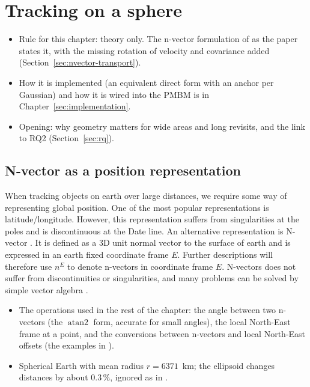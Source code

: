 \section{Tracking on a sphere}
\label{sec:nvector}
\begin{itemize}
    \item Rule for this chapter: theory only. The n-vector formulation of \cite{b_gade_2024} as the paper states it, with the missing rotation of velocity and covariance added (Section~\ref{sec:nvector-transport}).
    \item How it is implemented (an equivalent direct form with an anchor per Gaussian) and how it is wired into the PMBM is in Chapter~\ref{sec:implementation}.
    \item Opening: why geometry matters for wide areas and long revisits, and the link to RQ2 (Section~\ref{sec:rq}).
\end{itemize}

\subsection{N-vector as a position representation}
When tracking objects on earth over large distances, we require some way of representing global position. One of the most popular representations is latitude/longitude. However, this representation suffers from singularities at the poles and is discontinuous at the Date line. An alternative representation is N-vector \parencite{k_gade_2010}. It is defined as a 3D unit normal vector to the surface of earth and is expressed in an earth fixed coordinate frame $E$. Further descriptions will therefore use $n^E$ to denote n-vectors in coordinate frame $E$. N-vectors does not suffer from discontinuities or singularities, and many problems can be solved by simple vector algebra \parencite{k_gade_2010}. 
\begin{itemize}
    \item The operations used in the rest of the chapter: the angle between two n-vectors (the $\operatorname{atan2}$ form, accurate for small angles), the local North-East frame at a point, and the conversions between n-vectors and local North-East offsets (the examples in \cite{ffi_nvector}).
    \item Spherical Earth with mean radius $r = 6371$~km; the ellipsoid changes distances by about 0.3\,\%, ignored as in \cite{b_gade_2024}.
\end{itemize}

